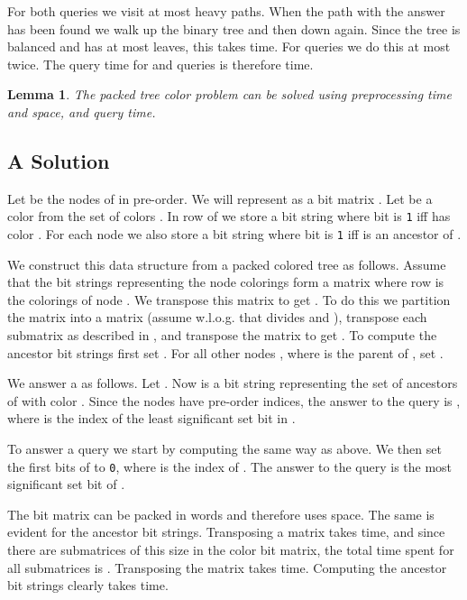 \documentclass[11pt]{article}
\newtheorem{lemma}{Lemma}
\begin{document}
For both queries we visit at most  heavy paths. When the path with the answer has been found we walk up the binary tree and then down again. Since the tree is balanced and has at most  leaves, this takes  time. For  queries we do this at most twice. The query time for  and  queries is therefore  time.

\begin{lemma}
The packed tree color problem can be solved using  preprocessing time and space, and  query time.
\end{lemma}

\subsection{A  Solution}



Let  be the nodes of  in pre-order. We will represent  as a  bit matrix . Let  be a color from the set of colors . In row  of  we store a bit string where bit  is \texttt{1} iff  has color . For each node  we also store a bit string  where bit  is \texttt{1} iff  is an ancestor of .

We construct this data structure from a packed colored tree as follows. Assume that the bit strings representing the node colorings form a  matrix where row  is the colorings of node . We transpose this matrix to get . To do this we partition the matrix into a  matrix (assume w.l.o.g. that  divides  and ), transpose each  submatrix as described in \cite{thorup2002randomized}, and transpose the  matrix to get . To compute the ancestor bit strings first set . For all other nodes , where  is the parent of , set .

We answer a  as follows. Let . Now  is a bit string representing the set of ancestors of  with color . Since the nodes have pre-order indices, the answer to the query is , where  is the index of the least significant set bit in . 

To answer a  query we start by computing  the same way as above. We then set the first  bits of  to \texttt{0}, where  is the index of . The answer to the query is the most significant set bit of .

The  bit matrix  can be packed in words and therefore uses  space. The same is evident for the ancestor bit strings. Transposing a  matrix takes  time, and since there are  submatrices of this size in the color bit matrix, the total time spent for all submatrices is . Transposing the  matrix takes  time. Computing the ancestor bit strings clearly takes  time.
\end{document}
